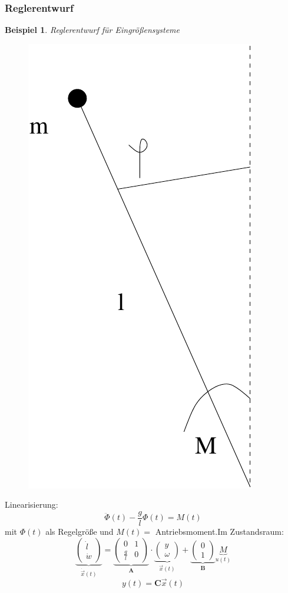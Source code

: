 \message{ !name(Mitschrieb_SysRegel.tex)}\documentclass[12pt,a4paper,ngerman]{scrartcl}
\newtheorem{bsp}{Beispiel}[section] %
\begin{document}
\subsubsection{Reglerentwurf}

\begin{bsp}
Reglerentwurf für Eingrößensysteme
\end{bsp}
\begin{figure}[H]
  \centering
  \includegraphics[width=.2\linewidth]{sysregel_No_6}
\end{figure}
Linearisierung:
\[
\ddot{\Phi}(t)-\frac{g}{l}\Phi(t)=M(t)
\]
mit $\Phi(t)$ als Regelgröße und $M(t) =$ Antriebsmoment.Im Zustandsraum:
\[
\underbrace{\begin{pmatrix}
  \dot{l}\\\dot{w}
\end{pmatrix}}_{\dot{\vec{x}}(t)}
=
\underbrace{\begin{pmatrix}
  0&1\\
\frac{g}{l}&0
\end{pmatrix}}_{\mathbf{A}}
\cdot
\underbrace{\begin{pmatrix}
  y\\\omega
\end{pmatrix}}_{\vec{x}(t)}
+
\underbrace{\begin{pmatrix}
  0\\1
\end{pmatrix}}_{\mathbf{B}}
\underbrace{M}_{u(t)}
\]
\[
y(t)=\mathbf{C}\vec{x}(t)
\]
\end{document}
